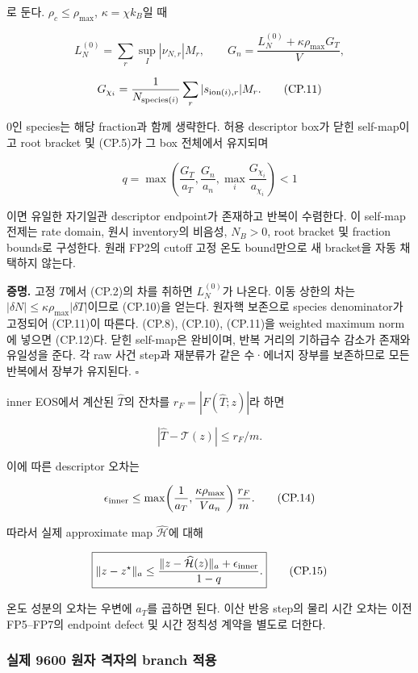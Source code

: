로 둔다. \(\rho_c\le\rho_{\max}\), \(\kappa=\chi k_B\)일 때

\[
L_N^{(0)}=\sum_r\sup_I|\nu_{N,r}|M_r,\qquad
G_n=\frac{L_N^{(0)}+\kappa\rho_{\max}G_T}{V},
\tag{CP.10}
\]

\[
G_{\chi_i}=\frac1{N_{{\rm species}(i)}}\sum_r|s_{{\rm ion}(i),r}|M_r.
\tag{CP.11}
\]

0인 species는 해당 fraction과 함께 생략한다. 허용 descriptor box가 닫힌 self-map이고 root bracket 및 (CP.5)가 그 box 전체에서 유지되며

\[
\boxed{q=\max\left(\frac{G_T}{a_T},\frac{G_n}{a_n},
\max_i\frac{G_{\chi_i}}{a_{\chi_i}}\right)<1}
\tag{CP.12}
\]

이면 유일한 자기일관 descriptor endpoint가 존재하고 반복이 수렴한다. 이 self-map 전제는 rate domain, 원시 inventory의 비음성, \(N_B>0\), root bracket 및 fraction bounds로 구성한다. 원래 FP2의 cutoff 고정 온도 bound만으로 새 bracket을 자동 채택하지 않는다.

\textbf{증명.} 고정 \(T\)에서 (CP.2)의 차를 취하면 \(L_N^{(0)}\)가 나온다. 이동 상한의 차는 \(|\delta N|\le\kappa\rho_{\max}|\delta T|\)이므로 (CP.10)을 얻는다. 원자핵 보존으로 species denominator가 고정되어 (CP.11)이 따른다. (CP.8), (CP.10), (CP.11)을 weighted maximum norm에 넣으면 (CP.12)다. 닫힌 self-map은 완비이며, 반복 거리의 기하급수 감소가 존재와 유일성을 준다. 각 raw 사건 step과 재분류가 같은 수·에너지 장부를 보존하므로 모든 반복에서 장부가 유지된다. \(\square\)

inner EOS에서 계산된 \(\widehat T\)의 잔차를 \(r_F=|F(\widehat T;z)|\)라 하면

\[
|\widehat T-\mathcal T(z)|\le r_F/m.
\tag{CP.13}
\]

이에 따른 descriptor 오차는

\[
\epsilon_{\rm inner}
\le \max\!\left(\frac1{a_T},\frac{\kappa\rho_{\max}}{Va_n}\right)\frac{r_F}{m}.
\tag{CP.14}
\]

따라서 실제 approximate map \(\widehat{\mathcal H}\)에 대해

\[
\boxed{\|z-z^\star\|_a\le
\frac{\|z-\widehat{\mathcal H}(z)\|_a+\epsilon_{\rm inner}}{1-q}.}
\tag{CP.15}
\]

온도 성분의 오차는 우변에 \(a_T\)를 곱하면 된다. 이산 반응 step의 물리 시간 오차는 이전 FP5--FP7의 endpoint defect 및 시간 정칙성 계약을 별도로 더한다.

\hypertarget{uxc2e4uxc81c-9600-uxc6d0uxc790-uxaca9uxc790uxc758-branch-uxc801uxc6a9}{%
\subsubsection{실제 9600 원자 격자의 branch 적용}\label{uxc2e4uxc81c-9600-uxc6d0uxc790-uxaca9uxc790uxc758-branch-uxc801uxc6a9}}

